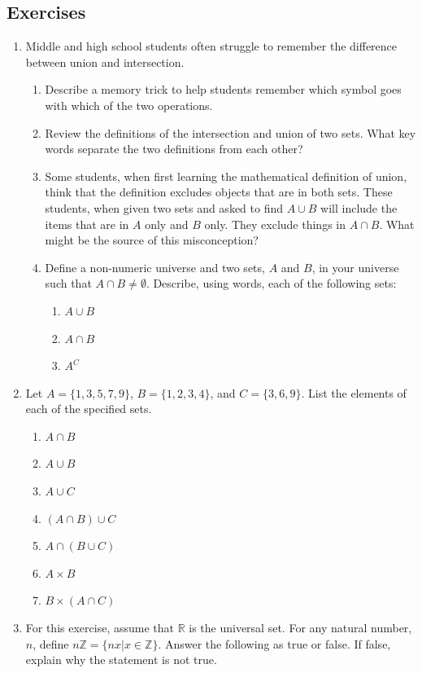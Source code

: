\documentclass[
]{book}
\providecommand{\tightlist}{%
  \setlength{\itemsep}{0pt}\setlength{\parskip}{0pt}}
\theoremstyle{definition}
\theoremstyle{definition}
\theoremstyle{definition}
\theoremstyle{remark}
\begin{document}
\hypertarget{exercises-4}{%
\subsection{Exercises}\label{exercises-4}}

\begin{enumerate}
\def\labelenumi{\arabic{enumi}.}
\item
  Middle and high school students often struggle to remember the difference between union and intersection.

  \begin{enumerate}
  \def\labelenumii{\alph{enumii})}
  \tightlist
  \item
    Describe a memory trick to help students remember which symbol goes with which of the two operations.
  \item
    Review the definitions of the intersection and union of two sets. What key words separate the two definitions from each other?
  \item
    Some students, when first learning the mathematical definition of union, think that the definition excludes objects that are in both sets. These students, when given two sets and asked to find \(A \cup B\) will include the items that are in \(A\) only and \(B\) only. They exclude things in \(A \cap B\). What might be the source of this misconception?
  \item
    Define a non-numeric universe and two sets, \(A\) and \(B\), in your universe such that \(A \cap B \neq \emptyset\). Describe, using words, each of the following sets:

    \begin{enumerate}
    \def\labelenumiii{\roman{enumiii}.}
    \tightlist
    \item
      \(A \cup B\)
    \item
      \(A \cap B\)
    \item
      \(A^{C}\)
    \end{enumerate}
  \end{enumerate}
\item
  Let \(A = \{1, 3, 5, 7, 9\}\), \(B=\{1, 2, 3, 4\}\), and \(C=\{3, 6, 9\}\). List the elements of each of the specified sets.

  \begin{enumerate}
  \def\labelenumii{\alph{enumii}.}
  \tightlist
  \item
    \(A \cap B\)
  \item
    \(A \cup B\)
  \item
    \(A \cup C\)
  \item
    \((A\cap B) \cup C\)
  \item
    \(A \cap (B \cup C)\)
  \item
    \(A \times B\)
  \item
    \(B \times (A\cap C)\)
  \end{enumerate}
\item
  For this exercise, assume that \(\mathbb{R}\) is the universal set. For any natural number, \(n\), define \(n\mathbb{Z} = \{nx \vert x \in \mathbb{Z}\}\). Answer the following as true or false. If false, explain why the statement is not true.


\end{enumerate}
\end{document}
